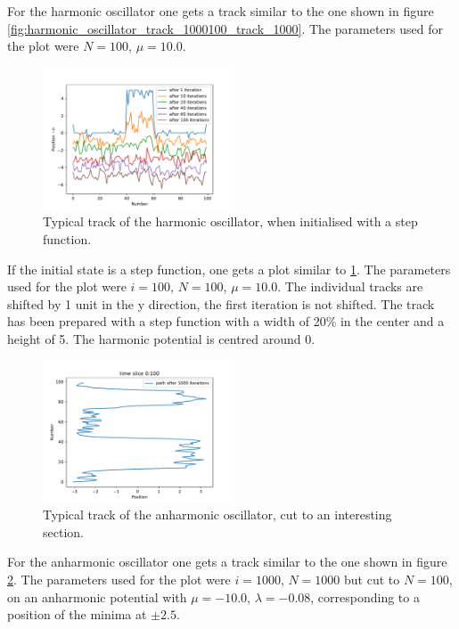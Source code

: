 \documentclass{scrartcl}
\begin{document}
		For the harmonic oscillator one gets a track similar to the one shown in figure \ref{fig:harmonic_oscillator_track_1000100_track_1000}.
		The parameters used for the plot were $N=100$, $\mu = 10.0$.
		\begin{figure}[H]
			\centering
				\includegraphics[width=0.5\textwidth]{../imgs/harmonic_oscillator_track/track_100100_step_track_shifted_double.pdf}
			\caption{Typical track of the harmonic oscillator, when initialised with a step function.}
			\label{fig:harmonic_oscillator_track_100100_100100_step_track_shifted_double}
		\end{figure}
		If the initial state is a step function, one gets a plot similar to \ref{fig:harmonic_oscillator_track_100100_100100_step_track_shifted_double}.
		The parameters used for the plot were $i=100$, $N=100$, $\mu = 10.0$.
		The individual tracks are shifted by 1 unit in the y direction, the first iteration is not shifted.
		The track has been prepared with a step function with a width of 20\% in the center and a height of 5.
		The harmonic potential is centred around 0.
		\begin{figure}[H]
			\centering
				\includegraphics[width=0.5\textwidth]{../imgs/anharmonic_oscillator_track/track_100010005_track_pretty_1000.pdf}
			\caption{Typical track of the anharmonic oscillator, cut to an interesting section.}
			\label{fig:anharmonic_oscillator_track_100010005_track_pretty_1000}
		\end{figure}
		For the anharmonic oscillator one gets a track similar to the one shown in figure \ref{fig:anharmonic_oscillator_track_100010005_track_pretty_1000}.
		The parameters used for the plot were $i=1000$, $N=1000$ but cut to $N=100$, on an anharmonic potential with $\mu = -10.0$, $\lambda = -0.08$, corresponding to a position of the minima at $\pm 2.5$.
\end{document}
